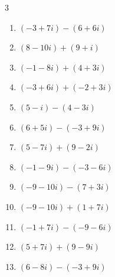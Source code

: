 \begin{multicols}{3}
\begin{enumerate}
        \phantom{$\displaystyle =-8i$}

  \item $\displaystyle (-3+7i) - (6+6i)$

        \phantom{$\displaystyle =-9+i$}

  \item $\displaystyle (8-10i) + (9+i)$

        \phantom{$\displaystyle =17-9i$}

  \item $\displaystyle (-1-8i) + (4+3i)$

        \phantom{$\displaystyle =3-5i$}

  \item $\displaystyle (-3+6i) + (-2+3i)$

        \phantom{$\displaystyle =-5+9i$}

  \item $\displaystyle (5-i) - (4-3i)$

        \phantom{$\displaystyle =1+2i$}

  \item $\displaystyle (6+5i) - (-3+9i)$

        \phantom{$\displaystyle =9-4i$}

  \item $\displaystyle (5-7i) + (9-2i)$

        \phantom{$\displaystyle =14-9i$}

  \item $\displaystyle (-1-9i) - (-3-6i)$

        \phantom{$\displaystyle =2-3i$}

  \item $\displaystyle (-9-10i) - (7+3i)$

        \phantom{$\displaystyle =-16-13i$}

  \item $\displaystyle (-9-10i) + (1+7i)$

        \phantom{$\displaystyle =-8-3i$}

  \item $\displaystyle (-1+7i) - (-9-6i)$

        \phantom{$\displaystyle =8+13i$}

  \item $\displaystyle (5+7i) + (9-9i)$

        \phantom{$\displaystyle =14-2i$}

  \item $\displaystyle (6-8i) - (-3+9i)$


\end{enumerate}
\end{multicols}
